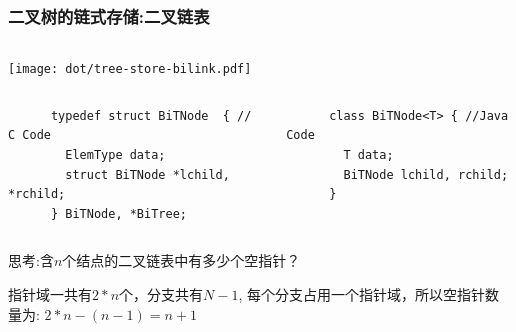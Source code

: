 \begin{frame}[fragile]
  \frametitle{二叉树的链式存储:二叉链表}
  \begin{columns}[T]
    \texttt{[image: dot/tree-store-bilink.pdf]}
  \end{columns}

  \small
  \begin{columns}
    \begin{verbatim}
      typedef struct BiTNode  { // C Code
        ElemType data;
        struct BiTNode *lchild, *rchild;
      } BiTNode, *BiTree;
    \end{verbatim}

    \begin{verbatim}
      class BiTNode<T> { //Java Code
        T data;
        BiTNode lchild, rchild;
      }
    \end{verbatim}
  \end{columns}

  思考:含$n$个结点的二叉链表中有多少个空指针？

  \pause
  指针域一共有$2*n$个，分支共有$N-1$,  每个分支占用一个指针域，所以空指针数量为:  $2*n - (n-1) = n+1$
\end{frame}

